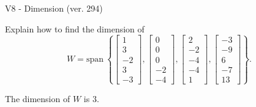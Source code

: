 \begin{exercise}
  \begin{exerciseTitle}V8 - Dimension (ver. 294)\end{exerciseTitle}
  \begin{exerciseStatement}
    Explain how to find the dimension of 
\[W=\mathrm{span}\ \left\{\left[\begin{array}{r}
1 \\
3 \\
-2 \\
3 \\
-3
\end{array}\right] , \left[\begin{array}{r}
0 \\
0 \\
0 \\
-2 \\
-4
\end{array}\right] , \left[\begin{array}{r}
2 \\
-2 \\
-4 \\
-4 \\
1
\end{array}\right] , \left[\begin{array}{r}
-3 \\
-9 \\
6 \\
-7 \\
13
\end{array}\right]\right\}.\]



  \end{exerciseStatement}
  \begin{exerciseAnswer}
   The dimension of \(W\) is  \(3\).
  


  \end{exerciseAnswer}
\end{exercise}